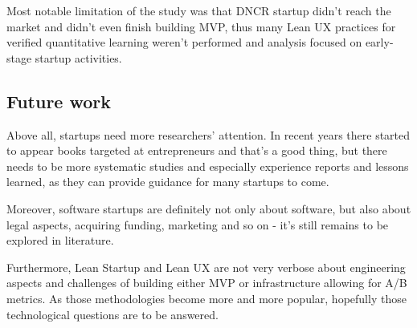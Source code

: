 \documentclass{article}
\begin{document}
Most notable limitation of the study was that DNCR startup didn't reach the market and didn't even finish building MVP, thus many Lean UX practices for verified quantitative learning weren't performed and analysis focused on early-stage startup activities.

\subsection{Future work}
Above all, startups need more researchers' attention. In recent years there started to appear books targeted at entrepreneurs and that's a good thing, but there needs to be more systematic studies and especially experience reports and lessons learned, as they can provide guidance for many startups to come.

Moreover, software startups are definitely not only about software, but also about legal aspects, acquiring funding, marketing and so on - it's still remains to be explored in literature.

Furthermore, Lean Startup and Lean UX are not very verbose about engineering aspects and challenges of building either MVP or infrastructure allowing for A/B metrics. As those methodologies become more and more popular, hopefully those technological questions are to be answered.

\listoffigures

 
\end{document}
